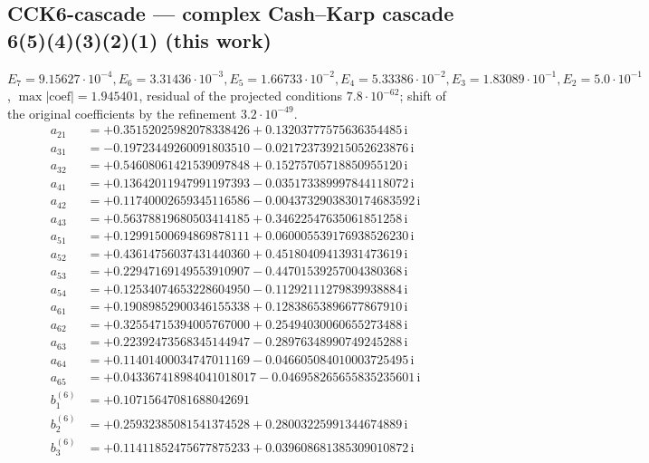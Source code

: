 \subsection*{CCK6-cascade --- complex Cash--Karp cascade 6(5)(4)(3)(2)(1) (this work)}
$E_{7}=9.15627\cdot10^{-4}, E_{6}=3.31436\cdot10^{-3}, E_{5}=1.66733\cdot10^{-2}, E_{4}=5.33386\cdot10^{-2}, E_{3}=1.83089\cdot10^{-1}, E_{2}=5.0\cdot10^{-1}$, $\max|\text{coef}|=1.945401$, residual of the projected conditions $7.8\cdot10^{-62}$; shift of the original coefficients by the refinement $3.2\cdot10^{-49}$. 
{\small\allowdisplaybreaks
\begin{align*}
a_{21} &= +0.35152025982078338426 + 0.13203777575636354485\,\mathrm{i}\\
a_{31} &= -0.19723449260091803510 - 0.021723739215052623876\,\mathrm{i}\\
a_{32} &= +0.54608061421539097848 + 0.15275705718850955120\,\mathrm{i}\\
a_{41} &= +0.13642011947991197393 - 0.035173389997844118072\,\mathrm{i}\\
a_{42} &= +0.11740002659345116586 - 0.0043732903830174683592\,\mathrm{i}\\
a_{43} &= +0.56378819680503414185 + 0.34622547635061851258\,\mathrm{i}\\
a_{51} &= +0.12991500694869878111 + 0.060005539176938526230\,\mathrm{i}\\
a_{52} &= +0.43614756037431440360 + 0.45180409413931473619\,\mathrm{i}\\
a_{53} &= +0.22947169149553910907 - 0.44701539257004380368\,\mathrm{i}\\
a_{54} &= +0.12534074653228604950 - 0.11292111279839938884\,\mathrm{i}\\
a_{61} &= +0.19089852900346155338 + 0.12838653896677867910\,\mathrm{i}\\
a_{62} &= +0.32554715394005767000 + 0.25494030060655273488\,\mathrm{i}\\
a_{63} &= +0.22392473568345144947 - 0.28976348990749245288\,\mathrm{i}\\
a_{64} &= +0.11401400034747011169 - 0.046605084010003725495\,\mathrm{i}\\
a_{65} &= +0.043367418984041018017 - 0.046958265655835235601\,\mathrm{i}\\[1mm]
b^{(6)}_{1} &= +0.10715647081688042691\\
b^{(6)}_{2} &= +0.25932385081541374528 + 0.28003225991344674889\,\mathrm{i}\\
b^{(6)}_{3} &= +0.11411852475677875233 + 0.039608681385309010872\,\mathrm{i}\\

\end{align*}}
